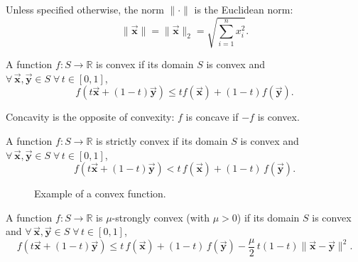 \documentclass[9pt, headings=standardclasses, parskip=half]{scrartcl}
\renewcommand{\emph}[1]{\textcolor{mypurple}{#1}}
\newcommand{\vect}[1]{\vec{\boldsymbol{#1}}}
\begin{document}
Unless specified otherwise, the norm \(\|\cdot\|\) is the Euclidean norm:
\[
\|\vect{x}\|=\|\vect{x}\|_{2}=\sqrt{\sum_{i=1}^{n} x_{i}^{2}} .
\]



\begin{definition}\label{def:convex_function}
A function \(f:S\rightarrow\mathbb{R}\) is \emph{convex} if its domain $S$ is convex and \(\forall\, \vect{x}, \vect{y} \in S\; \forall\, t\in[0,1]\),
\[
f\left(t\vect{x}+(1-t)\vect{y}\right)\leq t f(\vect{x})+(1-t)f(\vect{y}).
\]
\end{definition}

Concavity is the opposite of convexity: \(f\) is \emph{concave} if \(-f\) is convex.

\begin{definition}\label{def:strictly_convex_function}
A function \(f:S\rightarrow\mathbb{R}\) is \emph{strictly convex} if its domain $S$ is convex and \(\forall\, \vect{x}, \vect{y} \in S\; \forall\, t\in[0,1]\),
\[
f\left(t\vect{x}+(1-t)\vect{y}\right) < t\,f(\vect{x})+(1-t)\,f(\vect{y}).
\]
\end{definition}

\begin{figure}[h]
\centering
{}
\caption*{Example of a convex function.}
\label{fig:convex_fun}
\end{figure}

\begin{definition}\label{def:mu_strongly_convex_function}
A function \(f:S\rightarrow\mathbb{R}\) is \(\mu\)-\emph{strongly convex} (with \(\mu>0\)) if its domain $S$ is convex and \(\forall\, \vect{x}, \vect{y} \in S\; \forall\, t\in[0,1]\),
\[
f\left(t\vect{x}+(1-t)\vect{y}\right) \leq t\,f(\vect{x})+(1-t)\,f(\vect{y}) -\frac{\mu}{2}\,t(1-t)\|\vect{x}-\vect{y}\|^{2}.
\]
\end{definition}
\end{document}
